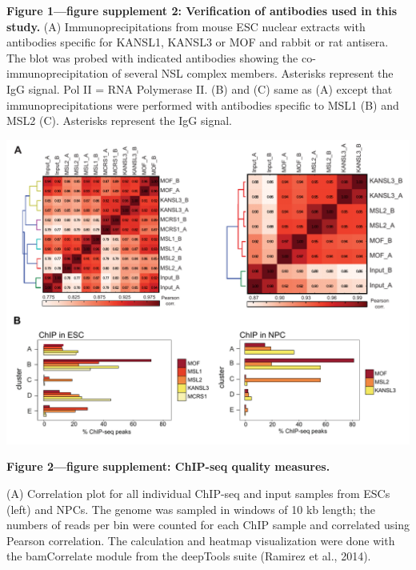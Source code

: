 \begin{footnotesize}
\begin{sffamily}
\begin{singlespacing}
\begin{minipage}[c]{0.4\textwidth}
\end{minipage} \hfill
\begin{minipage}[c]{0.4\textwidth}
\begin{flushleft}
\textbf{Figure 1—figure supplement 2: Verification of antibodies used in this study.}\tabularnewline \tabularnewline
(A) Immunoprecipitations from mouse ESC nuclear extracts with antibodies specific for KANSL1, KANSL3 or MOF and rabbit or rat antisera. The blot was probed with indicated antibodies showing the co-immunoprecipitation of several NSL complex members. Asterisks represent the IgG signal. Pol II = RNA Polymerase II.\tabularnewline \tabularnewline
(B) and (C) same as (A) except that immunoprecipitations were performed with antibodies specific to MSL1 (B) and MSL2 (C). Asterisks represent the IgG signal.
\end{flushleft}
\end{minipage}
\newpage
\includegraphics[width=\textwidth]{Figures/Appendix/Figure2_supplemental_figure1_scissored.pdf}

\textbf{Figure 2—figure supplement: ChIP-seq quality measures.}

(A) Correlation plot for all individual ChIP-seq and input samples from ESCs (left) and NPCs. The genome was sampled in windows of 10 kb length; the numbers of reads per bin were counted for each ChIP sample and correlated using Pearson correlation. The calculation and heatmap visualization were done with the bamCorrelate module from the deepTools suite (Ramirez et al., 2014).


\end{singlespacing}
\end{sffamily}
\end{footnotesize}
